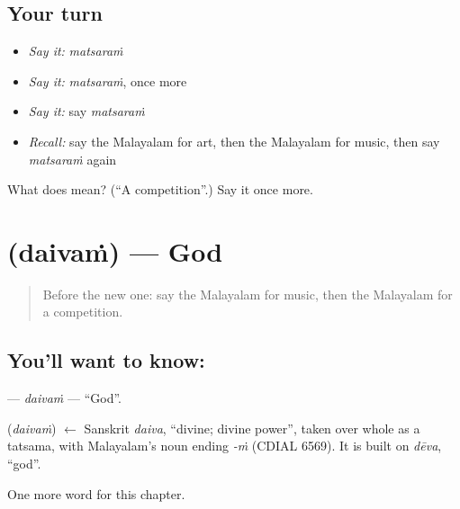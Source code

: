 \subsection*{Your turn}
\begin{itemize}
\raggedright
  \item \emph{Say it:} \emph{matsaraṁ}
  \item \emph{Say it:} \emph{matsaraṁ}, once more
  \item \emph{Say it:} say \emph{matsaraṁ}
  \item \emph{Recall:} say the Malayalam for art, then the Malayalam for music, then say \emph{matsaraṁ} again
\end{itemize}

\begin{tcolorbox}[breakable,colback=teal!4,colframe=teal!35!black,title={Before you move on}]
What does  mean? (\textquotedblleft{}A competition\textquotedblright{}.) Say it once more.
\end{tcolorbox}
\section[\texorpdfstring{\ml{ദൈവം} (daivaṁ)}{ദൈവം (daivaṁ)}]{ (daivaṁ) — God}

\label{lesson:ML-C212-daivam}



\begin{quote}
Before the new one: say the Malayalam for music, then the Malayalam for a competition.
\end{quote}

\subsection*{You'll want to know: }
\textbf{} — \emph{daivaṁ} — \textquotedblleft{}God\textquotedblright{}.

\begin{cousinweb}
\textbf{} (\emph{daivaṁ}) $\leftarrow$ Sanskrit \emph{daiva}, \textquotedblleft{}divine; divine power\textquotedblright{}, taken over whole as a tatsama, with Malayalam's noun ending \emph{-ṁ} (CDIAL 6569). It is built on \emph{dēva}, \textquotedblleft{}god\textquotedblright{}.
\end{cousinweb}

\begin{grammarlens}[title={What you've built}]
One more word for this chapter.
\end{grammarlens}

